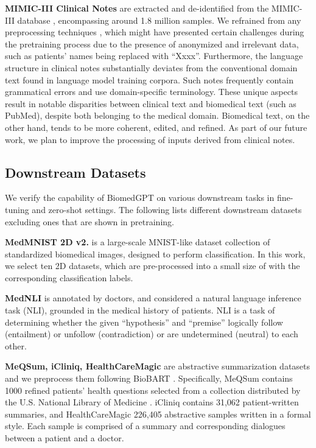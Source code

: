 \documentclass[10pt]{article} \usepackage[preprint]{tmlr}
\begin{document}
\noindent \textbf{MIMIC-III Clinical Notes} are extracted and de-identified from the MIMIC-III database \citep{goldberger2000physiobank, johnson2016mimic}, encompassing around 1.8 million samples. We refrained from any preprocessing techniques \citep{nuthakki2019natural}, which might have presented certain challenges during the pretraining process due to the presence of anonymized and irrelevant data, such as patients' names being replaced with ``Xxxx''. Furthermore, the language structure in clinical notes substantially deviates from the conventional domain text found in language model training corpora. Such notes frequently contain grammatical errors and use domain-specific terminology. These unique aspects result in notable disparities between clinical text and biomedical text (such as PubMed), despite both belonging to the medical domain. Biomedical text, on the other hand, tends to be more coherent, edited, and refined. As part of our future work, we plan to improve the processing of inputs derived from clinical notes.

\subsection{Downstream Datasets}
We verify the capability of BiomedGPT on various downstream tasks in fine-tuning and zero-shot settings. The following lists different downstream datasets excluding ones that are shown in pretraining. 
\vspace{5pt}



\noindent \textbf{MedMNIST 2D v2.} \citep{medmnistv2} is a large-scale MNIST-like dataset collection of standardized biomedical images, designed to perform classification. In this work, we select ten 2D datasets, which are pre-processed into a small size of  with the corresponding classification labels. 
\vspace{5pt}

\noindent \textbf{MedNLI} \citep{romanov2018lessons} is annotated by doctors, and considered a natural language inference task (NLI), grounded in the medical history of patients. NLI is a task of determining whether the given “hypothesis” and “premise” logically follow (entailment) or unfollow (contradiction) or are undetermined (neutral) to each other.
\vspace{5pt}

\noindent \textbf{MeQSum, iCliniq, HealthCareMagic} \citep{abacha2019summarization, zeng2020meddialog} are abstractive summarization datasets and we preprocess them following BioBART \citep{yuan2022biobart}. Specifically, MeQSum contains 1000 refined patients’ health questions selected from a collection distributed by the U.S. National Library of Medicine \citep{kilicoglu2018semantic}. iCliniq contains 31,062 patient-written summaries, and HealthCareMagic 226,405 abstractive samples written in a formal style. Each sample is comprised of a summary and corresponding dialogues between a patient and a doctor.
\end{document}
